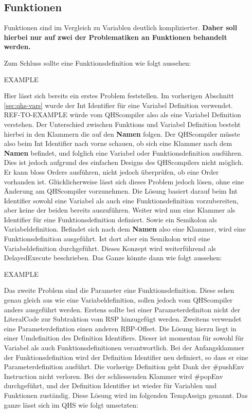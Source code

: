 \subsection{Funktionen}
Funktionen sind im Vergleich zu Variablen deutlich komplizierter. \textbf{Daher soll hierbei nur auf zwei der Problematiken an Funktionen behandelt werden.}

Zum Schluss sollte eine Funktionsdefinition wie folgt aussehen:

EXAMPLE

Hier lässt sich bereits ein erstes Problem feststellen. Im vorherigen Abschnitt \ref{sec:qhs-vars} wurde der Int Identifier für eine Variabel Definition verwendet. 
REF-TO-EXAMPLE würde vom QHScompiler also als eine Variabel Definition verstehen. Der Unterschied zwischen Funktions und Variabel Definition besteht hierbei in den Klammern die auf den \textbf{Namen} folgen.
Der QHScompiler müsste also beim Int Identifier nach vorne schauen, ob sich eine Klammer nach dem \textbf{Namen} befindet, und folglich eine Variabel oder Funktionsdefinition ausführen.
Dies ist jedoch aufgrund des einfachen Designs des QHScompilers nicht möglich. Er kann bloss Orders ausführen, nicht jedoch überprüfen, ob eine Order vorhanden ist. Glücklicherweise lässt sich dieses Problem jedoch lösen,
ohne eine Änderung am QHScompiler vorzunehmen. Die Lösung basiert darauf beim Int Identifier sowohl eine Variabel als auch eine Funktionsdefinition vorzubereiten, aber keine der beiden bereits auszuführen.
Weiter wird nun eine Klammer als Identifier für eine Funktionsdefinition definiert. Sowie ein Semikolon als Variabeldefinition. Befindet sich nach dem \textbf{Namen} also eine Klammer, wird eine Funktionsdefinition ausgeführt.
Ist dort aber ein Semikolon wird eine Variabeldefinition durchgeführt. Dieses Konzept wird weiterführend als DelayedExecute beschrieben. Das Ganze könnte dann wie folgt aussehen:

EXAMPLE


Das zweite Problem sind die Parameter eine Funktionsdefinition. Diese sehen genau gleich aus wie eine Variabeldefinition, sollen jedoch vom QHScompiler anders ausgeführt werden.
Erstens sollte bei einer Parameterdefiniton nicht der LiteralCode zur Subtraktion vom RSP hinzugefügt werden. Zweitens verwendet eine Parameterdefintion einen anderen RBP-Offset.
Die Lösung hierzu liegt in einer Umdefinition des Definition Identifiers. Dieser ist momentan für sowohl für Variabel als auch Funktionsdefinitionen verantwortlich.
Bei der Anfangsklammer der Funktionsdefinition wird der Definition Identifier neu definiert, so dass er eine Parameterdefinition ausführt. Die vorherige Definition geht Dank der \#pushEnv Instruction nicht verloren.
Bei der schliessenden Klammer wird \#popEnv durchgeführt, und der Definition Identifier ist wieder für Variablen und Funktionen zuständig. Diese Lösung wird im folgenden TempAssign genannt.
Das ganze lässt sich im QHS wie folgt umsetzten:


